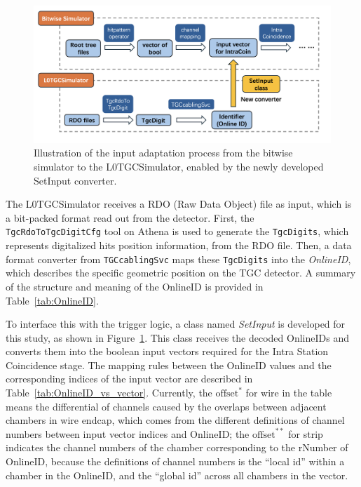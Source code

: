 \begin{figure}[htbp]
  \centering
  \includegraphics[width=1.0\textwidth]{figs/chapter5/input_adaptation.png}
  \caption{Illustration of the input adaptation process from the bitwise simulator to the L0TGCSimulator, enabled by the newly developed SetInput converter.}
  \label{fig:input_adaptation}
\end{figure}

The L0TGCSimulator receives a RDO (Raw Data Object) file as input, which is a bit-packed format read out from the detector. First, the \\\texttt{TgcRdoToTgcDigitCfg} tool on Athena is used to generate the \texttt{TgcDigits}, which represents digitalized hits position information, from the RDO file. Then, a data format converter from \texttt{TGCcablingSvc} maps these \texttt{TgcDigits} into the \textit{OnlineID}, which describes the specific geometric position on the TGC detector. A summary of the structure and meaning of the OnlineID is provided in Table~\ref{tab:OnlineID}.


To interface this with the trigger logic, a class named \textit{SetInput} is developed for this study, as shown in Figure~\ref{fig:input_adaptation}. This class receives the decoded OnlineIDs and converts them into the boolean input vectors required for the Intra Station Coincidence stage. The mapping rules between the OnlineID values and the corresponding indices of the input vector are described in Table~\ref{tab:OnlineID_vs_vector}. Currently, the $\text{offset}^{*}$ for wire in the table means the differential of channels caused by the overlaps between adjacent chambers in wire endcap, which comes from the different definitions of channel numbers between input vector indices and OnlineID; the $\text{offset}^{**}$ for strip indicates the channel numbers of the chamber corresponding to the rNumber of OnlineID, because the definitions of channel numbers is the ``local id'' within a chamber in the OnlineID, and the ``global id'' across all chambers in the vector.


